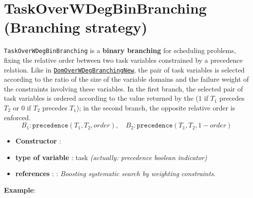 \section{TaskOverWDegBinBranching (Branching strategy)}\label{taskdomoverwdeg:taskdomoverwdegbranchstrat}\hypertarget{taskdomoverwdeg:taskdomoverwdegbranchstrat}{}
\begin{notedef}
  \texttt{TaskOverWDegBinBranching} is a \textbf{binary branching} for scheduling problems, fixing the relative order between two task variables constrained by a precedence relation. Like in \hyperlink{domoverwdegbin:domoverwdegbinbranchstrat}{\texttt{DomOverWDegBranchingNew}}, the pair of task variables is selected according to the ratio of the size of the variable domains and the failure weight of the constraints involving these variables. 
  In the first branch, the selected pair of task variables is ordered according to the value returned by the  ($1$ if $T_1$ precedes $T_2$ or $0$ if $T_2$ precedes $T_1$); in the second branch, the opposite relative order is enforced.
$$B_1: \texttt{precedence}(T_1,T_2,order),\quad B_2: \texttt{precedence}(T_1,T_2,1-order)$$
\end{notedef}

\begin{itemize}
\item \textbf{Constructor} :
\item \textbf{type of variable} : task \emph{(actually: precedence boolean indicator)}
\item \textbf{references} : \cite{Boussemart04}: \emph{Boosting systematic search by weighting constraints}.
\end{itemize}

\textbf{Example}:
% 

